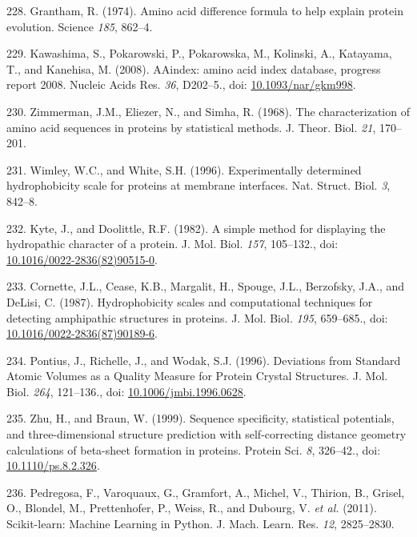 \documentclass[11pt,a4paper,twoside]{book}
\theoremstyle{definition}
\theoremstyle{definition}
\theoremstyle{remark}
\begin{document}
\hypertarget{ref-Grantham1974}{}
228. Grantham, R. (1974). Amino acid difference formula to help explain
protein evolution. Science \emph{185}, 862--4.

\hypertarget{ref-Kawashima2008}{}
229. Kawashima, S., Pokarowski, P., Pokarowska, M., Kolinski, A.,
Katayama, T., and Kanehisa, M. (2008). AAindex: amino acid index
database, progress report 2008. Nucleic Acids Res. \emph{36}, D202--5.,
doi: \href{https://doi.org/10.1093/nar/gkm998}{10.1093/nar/gkm998}.

\hypertarget{ref-Zimmerman1968}{}
230. Zimmerman, J.M., Eliezer, N., and Simha, R. (1968). The
characterization of amino acid sequences in proteins by statistical
methods. J. Theor. Biol. \emph{21}, 170--201.

\hypertarget{ref-Wimley1996}{}
231. Wimley, W.C., and White, S.H. (1996). Experimentally determined
hydrophobicity scale for proteins at membrane interfaces. Nat. Struct.
Biol. \emph{3}, 842--8.

\hypertarget{ref-Kyte1982}{}
232. Kyte, J., and Doolittle, R.F. (1982). A simple method for
displaying the hydropathic character of a protein. J. Mol. Biol.
\emph{157}, 105--132., doi:
\href{https://doi.org/10.1016/0022-2836(82)90515-0}{10.1016/0022-2836(82)90515-0}.

\hypertarget{ref-Cornette1987}{}
233. Cornette, J.L., Cease, K.B., Margalit, H., Spouge, J.L., Berzofsky,
J.A., and DeLisi, C. (1987). Hydrophobicity scales and computational
techniques for detecting amphipathic structures in proteins. J. Mol.
Biol. \emph{195}, 659--685., doi:
\href{https://doi.org/10.1016/0022-2836(87)90189-6}{10.1016/0022-2836(87)90189-6}.

\hypertarget{ref-Pontius1996}{}
234. Pontius, J., Richelle, J., and Wodak, S.J. (1996). Deviations from
Standard Atomic Volumes as a Quality Measure for Protein Crystal
Structures. J. Mol. Biol. \emph{264}, 121--136., doi:
\href{https://doi.org/10.1006/jmbi.1996.0628}{10.1006/jmbi.1996.0628}.

\hypertarget{ref-Zhu1999}{}
235. Zhu, H., and Braun, W. (1999). Sequence specificity, statistical
potentials, and three-dimensional structure prediction with
self-correcting distance geometry calculations of beta-sheet formation
in proteins. Protein Sci. \emph{8}, 326--42., doi:
\href{https://doi.org/10.1110/ps.8.2.326}{10.1110/ps.8.2.326}.

\hypertarget{ref-Pedregosa2011}{}
236. Pedregosa, F., Varoquaux, G., Gramfort, A., Michel, V., Thirion,
B., Grisel, O., Blondel, M., Prettenhofer, P., Weiss, R., and Dubourg,
V. \emph{et al.} (2011). Scikit-learn: Machine Learning in Python. J.
Mach. Learn. Res. \emph{12}, 2825--2830.
\end{document}
